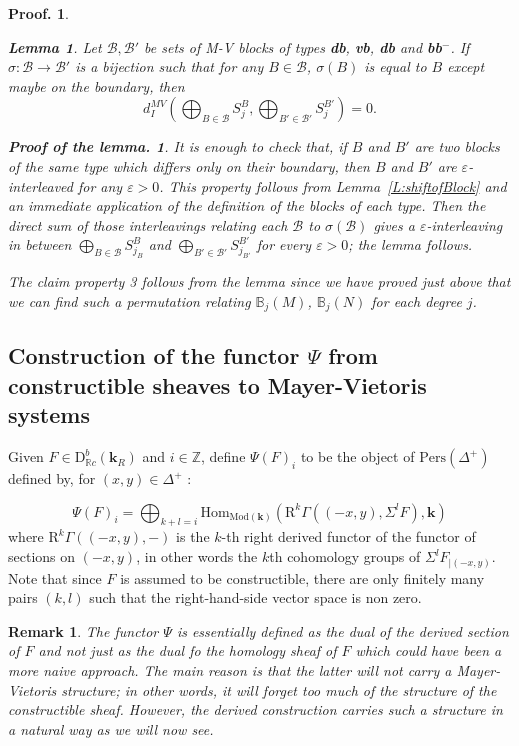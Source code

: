 \documentclass[a4paper, english, 11pt]{article}
\newcommand{\kk}[0]{\textbf{k}}
\newcommand{\Mod}[0]{\text{Mod}}
\newcommand{\0}{\vec{0}}
\newcommand{\R}[0]{\mathbb{R}}
\newcommand{\Z}[0]{\mathbb{Z}}
\newcommand{\D}[0]{\text{D}}
\newcommand{\Hom}[0]{\text{Hom}}
\newcommand{\Pers}[0]{\text{Pers}}
\newcommand{\Rr}[0]{\text{R}}
\newtheorem*{pf}{Proof.} }
\newtheorem*{pfofLemma}{Proof of the lemma.} }
\newtheorem{remark}[prop]{Remark}
\newtheorem{lem}[prop]{Lemma}
\begin{document}
\begin{pf}
\begin{lem} Let $\mathcal{B}, \mathcal{B}'$ be sets of M-V blocks of types \textbf{db}, \textbf{vb}, \textbf{db} and \textbf{bb}$^-$. 
If $\sigma: \mathcal{B} \to \mathcal{B}'$ is a bijection such that for any $B\in \mathcal{B}$, $\sigma(B)$ is equal to $B$ except maybe on the boundary, then 
$$d_I^{MV}\left(\bigoplus_{B\in \mathcal{B}} S^B_{j}, \bigoplus_{B'\in \mathcal{B}'} S^{B'}_{j}\right) =0.$$
\end{lem}
\begin{pfofLemma} It is enough to check that,
 if $B$ and $B'$ are two blocks of the same type which differs only on their boundary, then $B$ and $B'$ are $\varepsilon$-interleaved for any $\varepsilon >0$. This property follows from Lemma~\ref{L:shiftofBlock} and an immediate application of the definition of the blocks of each type. 
 Then  the direct sum of those interleavings relating each $\mathcal{B}$ to $\sigma(\mathcal{B})$  gives a $\varepsilon$-interleaving in between $\bigoplus_{B\in \mathcal{B}} S^B_{j_B}$ and  $\bigoplus_{B'\in \mathcal{B}'} S^{B'}_{j_{B'}}$ for every $\varepsilon >0$; the lemma follows.
\end{pfofLemma}
The  claim property 3 follows from the lemma since we have proved just above that we can find such a 
permutation relating $\mathbb{B}_j(M)$, $\mathbb{B}_j(N)$ for each degree $j$.
\end{pf}



\subsection{Construction of the functor $\Psi$ from constructible sheaves to Mayer-Vietoris systems}\label{SS:Psi}

Given $F \in \D^b_{\R c}(\kk_R)$ and $i \in \Z$, define $\Psi(F)_i$ to be the object of $\Pers(\Delta^+)$ defined by, for $(x,y)\in \Delta^+$ : 

$$\Psi(F)_i =\bigoplus_{k+l = i} \Hom_{\Mod(\kk)}\left ( \Rr^k\Gamma \left ( (-x,y) , \Sigma^l F\right ), \kk \right )  $$
where $\Rr^k\Gamma \left ( (-x,y) , -\right )$ is the $k$-th right derived functor of the functor of sections on $(-x,y)$, in other words the $k$th cohomology groups of $\Sigma^l F_{|(-x, y)}$. Note that since $F$ is assumed to be constructible, there are only finitely many pairs $(k,l)$ such that the right-hand-side vector space is non zero.
\begin{remark}
 The functor $\Psi$ is essentially defined as the dual of the derived section of $F$ and not just as the dual fo the homology sheaf of $F$ which could have been a more naive approach. The main reason is that the latter will not carry a Mayer-Vietoris structure; in other words, it will forget too much of the structure of the constructible sheaf. However, the derived construction carries such a structure in a natural way as we will now see.
\end{remark}
\end{document}
